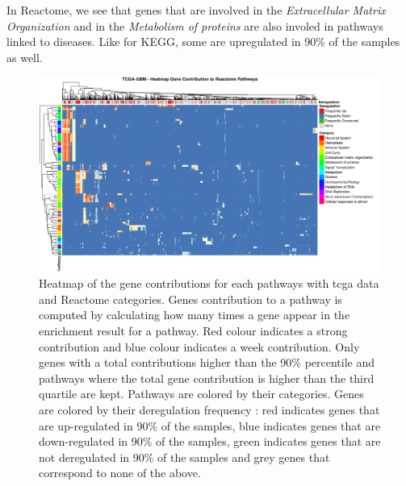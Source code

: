 In Reactome, we see that genes that are involved in the \textit{Extracellular Matrix Organization} and in the \textit{Metabolism of proteins} are also involed in pathways linked to diseases.
Like for KEGG, some are upregulated in 90\% of the samples as well.
\begin{figure}[h]
    \centering
    \includegraphics[width=\textwidth]{img/gene_contrib_reactome_tcga}
    \caption {
        Heatmap of the gene contributions for each pathways with \acrshort{tcga} data and Reactome categories.
        Genes contribution to a pathway is computed by calculating how many times a gene appear in the enrichment result for a pathway.
        Red colour indicates a strong contribution and blue colour indicates a week contribution.
        Only genes with a total contributions higher than the 90\% percentile and pathways where the total gene contribution is higher than the third quartile are kept.
        Pathways are colored by their categories.
        Genes are colored by their deregulation frequency : red indicates genes that are up-regulated in 90\% of the samples, blue indicates genes that are down-regulated in 90\% of the samples, green indicates genes that are not deregulated in 90\% of the samples and grey genes that correspond to none of the above.
    }
    \label{supp:gene-contrib-reactome-tcga}
\end{figure}